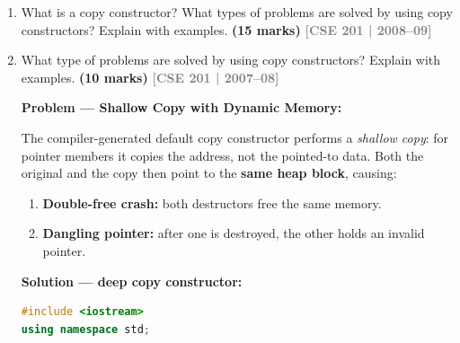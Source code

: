 \documentclass[12pt,a3paper]{article}
\newcommand{\yr}[1]{\hfill\textcolor{gray}{\small\textbf{[#1]}}}
\newcommand{\mk}[1]{\textcolor{orange!70!black}{\small\textbf{(#1 marks)}}}
\begin{document}
\begin{enumerate}
\begin{tcolorbox}
\begin{lstlisting}[language=C++]
    // Deep copy constructor
    dyna(const dyna& obj) {
        p=(int*)malloc(sizeof(int)); *p=*obj.p;
    }
    ~dyna() { free(p); }
    int get() { return *p; }
};

dyna neg(dyna ob) { return dyna(-ob.get()); }

int main() {
    dyna ob(10);
    cout << neg(ob).get() << "\n";  // -10
}
\end{lstlisting}

\textbf{Problem without copy constructor:} \texttt{neg(dyna ob)}
takes by value --- shallow copy shares \texttt{p}.  Parameter's
destructor frees it; original \texttt{ob} has dangling pointer.

\end{tcolorbox}

\item What is a copy constructor? What types of problems are solved by using copy constructors? Explain with examples. \mk{15}
\yr{CSE 201 | 2008--09}



\item What type of problems are solved by using copy constructors? Explain with examples. \mk{10}
\yr{CSE 201 | 2007--08}

\begin{tcolorbox}[enhanced,breakable,ansbox,colback=cE!4,colframe=cE,
  boxrule=0.8pt,arc=5pt,
  title={\textbf{Answer --- Problems solved by copy constructors}},
  fonttitle=\bfseries\color{white},colbacktitle=cE]

\textbf{Problem --- Shallow Copy with Dynamic Memory:}

The compiler-generated default copy constructor performs a
\emph{shallow copy}: for pointer members it copies the address, not
the pointed-to data.  Both the original and the copy then point to
the \textbf{same heap block}, causing:
\begin{enumerate}[label=\textbf{\arabic*.}]
  \item \textbf{Double-free crash:} both destructors free the same memory.
  \item \textbf{Dangling pointer:} after one is destroyed, the other
    holds an invalid pointer.
\end{enumerate}

\textbf{Solution --- deep copy constructor:}
\begin{lstlisting}[language=C++]
#include <iostream>
using namespace std;


\end{lstlisting}
\end{tcolorbox}
\end{enumerate}
\end{document}
